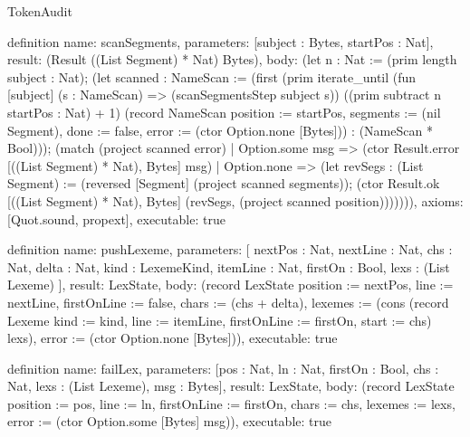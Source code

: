 \begin{lexlean}{TokenAudit}
\begin{semanticmodule}
definition{
  name: scanSegments,
  parameters: [subject : Bytes, startPos : Nat],
  result: (Result ((List Segment) * Nat) Bytes),
  body: (let n : Nat := (prim length subject : Nat); (let scanned : NameScan := (first (prim iterate_until (fun [subject] (s : NameScan) => (scanSegmentsStep subject s)) ((prim subtract n startPos : Nat) + 1) (record NameScan {position := startPos, segments := (nil Segment), done := false, error := (ctor Option.none [Bytes])}) : (NameScan * Bool))); (match (project scanned error)
    | Option.some msg => (ctor Result.error [((List Segment) * Nat), Bytes] msg)
    | Option.none => (let revSegs : (List Segment) := (reversed [Segment] (project scanned segments)); (ctor Result.ok [((List Segment) * Nat), Bytes] (revSegs, (project scanned position))))))),
  axioms: [Quot.sound, propext],
  executable: true
}

definition{
  name: pushLexeme,
  parameters: [
    nextPos : Nat,
    nextLine : Nat,
    chs : Nat,
    delta : Nat,
    kind : LexemeKind,
    itemLine : Nat,
    firstOn : Bool,
    lexs : (List Lexeme)
  ],
  result: LexState,
  body: (record LexState {position := nextPos, line := nextLine, firstOnLine := false, chars := (chs + delta), lexemes := (cons (record Lexeme {kind := kind, line := itemLine, firstOnLine := firstOn, start := chs}) lexs), error := (ctor Option.none [Bytes])}),
  executable: true
}

definition{
  name: failLex,
  parameters: [pos : Nat, ln : Nat, firstOn : Bool, chs : Nat, lexs : (List Lexeme), msg : Bytes],
  result: LexState,
  body: (record LexState {position := pos, line := ln, firstOnLine := firstOn, chars := chs, lexemes := lexs, error := (ctor Option.some [Bytes] msg)}),
  executable: true
}


\end{semanticmodule}
\end{lexlean}
